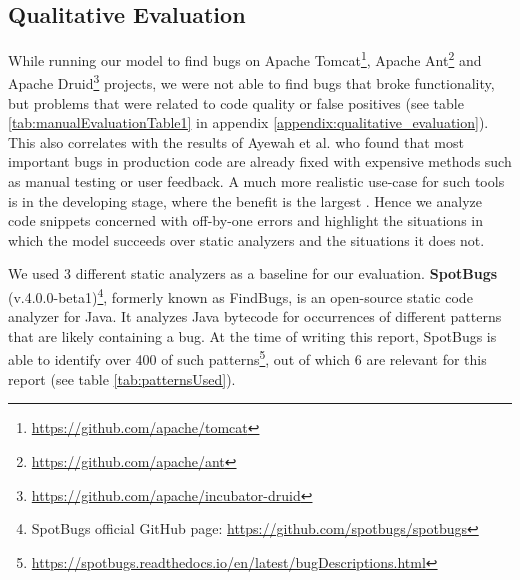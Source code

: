 \subsection{Qualitative Evaluation}
While running our model to find bugs on Apache Tomcat\footnote{\url{https://github.com/apache/tomcat}}, Apache Ant\footnote{\url{https://github.com/apache/ant}} and Apache Druid\footnote{\url{https://github.com/apache/incubator-druid}} projects, we were not able to find bugs that broke functionality, but problems that were related to code quality or false positives  (see table \ref{tab:manualEvaluationTable1} in appendix \ref{appendix:qualitative_evaluation}). This also correlates with the results of Ayewah et al. \cite{ayewah2010google} who found that most important bugs in production code are already fixed with expensive methods such as manual testing or user feedback. A much more realistic use-case for such tools is in the developing stage, where the benefit is the largest \cite{johnson2013don}. Hence we analyze code snippets concerned with off-by-one errors and highlight the situations in which the model succeeds over static analyzers and the situations it does not. 

We used 3 different static analyzers as a baseline for our evaluation. \textbf{SpotBugs} (v.4.0.0-beta1)\footnote{SpotBugs official GitHub page: \url{https://github.com/spotbugs/spotbugs}}, formerly known as FindBugs\cite{hovemeyer2004finding}, is an open-source static code analyzer for Java. It analyzes Java bytecode for occurrences of different patterns that are likely containing a bug. At the time of writing this report, SpotBugs is able to identify over 400 of such patterns\footnote{\url{https://spotbugs.readthedocs.io/en/latest/bugDescriptions.html}}, out of which 6 are relevant for this report (see table \ref{tab:patternsUsed}).


